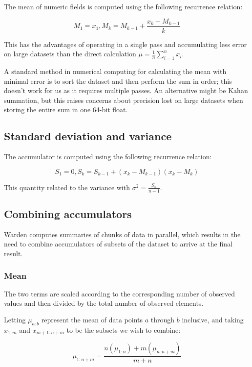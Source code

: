 \documentclass[a4paper]{article}
\begin{document}
The mean of numeric fields is computed using the following recurrence
relation\cite[pp.~232]{Knuth1997}:

\[M_1 = x_1, M_k = M_{k-1} + \frac{x_k - M_{k-1}}{k}\]

This has the advantages of operating in a single pass and accumulating
less error on large datasets than the direct calculation
\(\mu = \frac{1}{n} \sum\limits_{i=1}^n x_i\).

A standard method in numerical computing for calculating the mean with
minimal error is to sort the dataset and then perform the sum in order;
this doesn't work for us as it requires multiple passes. An alternative
might be Kahan summation\cite{Kahan1965}, but this raises concerns about
precision lost on large datasets when storing the entire sum in one
64-bit float.

\subsection{Standard deviation and
variance}\label{standard-deviation-and-variance}

The accumulator is computed using the following recurrence relation\cite[pp.~232]{Knuth1997}:

\[S_1 = 0, S_k = S_{k-1} + (x_k - M_{k-1})(x_k - M_k)\]

This quantity related to the variance with
\(\sigma^2 = \frac{S_n}{n-1}\).

\subsection{Combining accumulators}\label{combining-accumulators}

Warden computes summaries of chunks of data in parallel, which results
in the need to combine accumulators of subsets of the dataset to arrive
at the final result.

\subsubsection{Mean}\label{mean}

The two terms are scaled according to the corresponding number of
observed values and then divided by the total number of observed
elements.

Letting \(\mu_{a:b}\) represent the mean of data points \(a\) through
\(b\) inclusive, and taking \(x_{1:m}\) and \(x_{m+1:n+m}\) to be the
subsets we wish to combine:

\[\mu_{1:n+m} = \frac{n(\mu_{1:n}) + m(\mu_{n:n+m})}{m + n}\]
\end{document}
